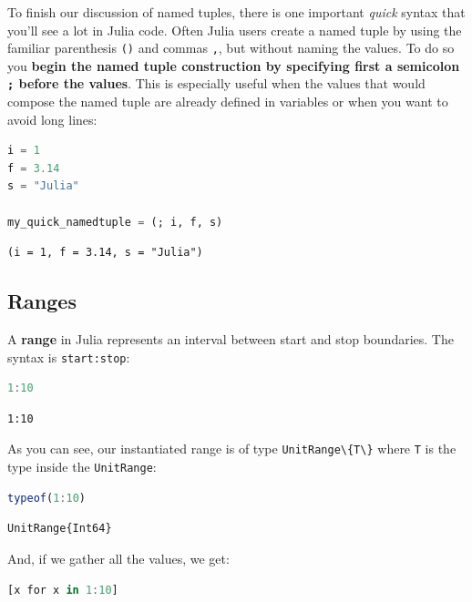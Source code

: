 \documentclass[
  notoc %
]{tufte-book}
\newcommand{\passthrough}[1]{#1}
\begin{document}
To finish our discussion of named tuples, there is one important
\emph{quick} syntax that you'll see a lot in Julia code. Often Julia
users create a named tuple by using the familiar parenthesis
\passthrough{\lstinline!()!} and commas \passthrough{\lstinline!,!}, but
without naming the values. To do so you \textbf{begin the named tuple
construction by specifying first a semicolon \passthrough{\lstinline!;!}
before the values}. This is especially useful when the values that would
compose the named tuple are already defined in variables or when you
want to avoid long lines:

\begin{lstlisting}[language=Julia]
i = 1
f = 3.14
s = "Julia"

my_quick_namedtuple = (; i, f, s)
\end{lstlisting}

\begin{lstlisting}[language=Output]
(i = 1, f = 3.14, s = "Julia")
\end{lstlisting}

\hypertarget{sec:ranges}{%
\subsection{Ranges}\label{sec:ranges}}

A \textbf{range} in Julia represents an interval between start and stop
boundaries. The syntax is \passthrough{\lstinline!start:stop!}:

\begin{lstlisting}[language=Julia]
1:10
\end{lstlisting}

\begin{lstlisting}[language=Output]
1:10
\end{lstlisting}

As you can see, our instantiated range is of type
\passthrough{\lstinline!UnitRange\{T\}!} where
\passthrough{\lstinline!T!} is the type inside the
\passthrough{\lstinline!UnitRange!}:

\begin{lstlisting}[language=Julia]
typeof(1:10)
\end{lstlisting}

\begin{lstlisting}[language=Output]
UnitRange{Int64}
\end{lstlisting}

And, if we gather all the values, we get:

\begin{lstlisting}[language=Julia]
[x for x in 1:10]
\end{lstlisting}
\end{document}
